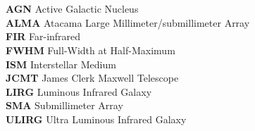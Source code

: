\thispagestyle{fancy}
\newcommand{\acronym}[2][]{
	\textbf{\textrm{#1}} \textrm{#2}\\
	}

\textrm{}\\\\

\noindent 

\acronym[AGN]{Active Galactic Nucleus}

\acronym[ALMA]{Atacama Large Millimeter/submillimeter Array}

\acronym[FIR]{Far-infrared}

\acronym[FWHM]{Full-Width at Half-Maximum}

\acronym[ISM]{Interstellar Medium}

\acronym[JCMT]{James Clerk Maxwell Telescope}

\acronym[LIRG]{Luminous Infrared Galaxy}

\acronym[SMA]{Submillimeter Array}

\acronym[ULIRG]{Ultra Luminous Infrared Galaxy}




